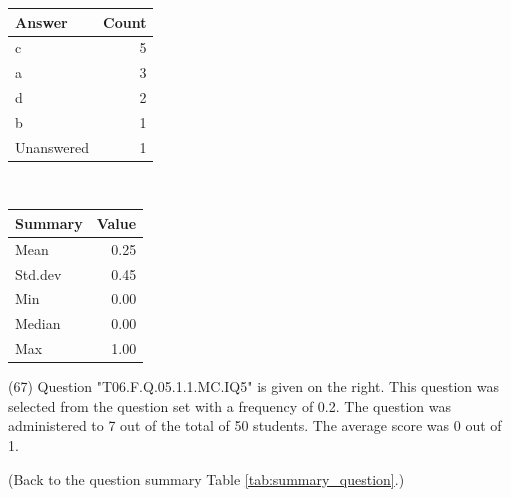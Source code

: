 \documentclass[12pt,english,nohyper]{tufte-handout}\usepackage[]{graphicx}\usepackage[]{color}
\begin{document}
\begin{center}%
\begin{tabular}{lr}
  \hline
Answer & Count \\ 
  \hline
c &   5 \\ 
  a &   3 \\ 
  d &   2 \\ 
  b &   1 \\ 
  Unanswered &   1 \\ 
   \hline
\end{tabular}
~~~~~~~~%
\begin{tabular}{lr}
  \hline
Summary & Value \\ 
  \hline
Mean & 0.25 \\ 
  Std.dev & 0.45 \\ 
  Min & 0.00 \\ 
  Median & 0.00 \\ 
  Max & 1.00 \\ 
   \hline
\end{tabular}
\end{center}\newpage{} (67) Question "T06.F.Q.05.1.1.MC.IQ5" is given on the right. This question was selected from the question set with a frequency of 0.2. The question was administered to 7 out of the total of 50 students. The average score was 0 out of 1.

 (Back to the question summary Table \ref{tab:summary_question}.)
\end{document}
